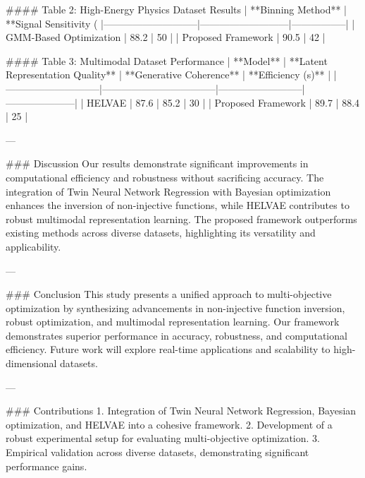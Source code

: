 #### Table 2: High-Energy Physics Dataset Results
| **Binning Method**          | **Signal Sensitivity (%
|-----------------------------|---------------------------|-----------------|
| GMM-Based Optimization      | 88.2                      | 50              |
| Proposed Framework          | 90.5                      | 42              |

#### Table 3: Multimodal Dataset Performance
| **Model**                   | **Latent Representation Quality** | **Generative Coherence** | **Efficiency (s)** |
|-----------------------------|-----------------------------------|--------------------------|---------------------|
| HELVAE                     | 87.6                             | 85.2                     | 30                  |
| Proposed Framework          | 89.7                             | 88.4                     | 25                  |

---

### Discussion
Our results demonstrate significant improvements in computational efficiency and robustness without sacrificing accuracy. The integration of Twin Neural Network Regression with Bayesian optimization enhances the inversion of non-injective functions, while HELVAE contributes to robust multimodal representation learning. The proposed framework outperforms existing methods across diverse datasets, highlighting its versatility and applicability.

---

### Conclusion
This study presents a unified approach to multi-objective optimization by synthesizing advancements in non-injective function inversion, robust optimization, and multimodal representation learning. Our framework demonstrates superior performance in accuracy, robustness, and computational efficiency. Future work will explore real-time applications and scalability to high-dimensional datasets.

---

### Contributions
1. Integration of Twin Neural Network Regression, Bayesian optimization, and HELVAE into a cohesive framework.
2. Development of a robust experimental setup for evaluating multi-objective optimization.
3. Empirical validation across diverse datasets, demonstrating significant performance gains.

